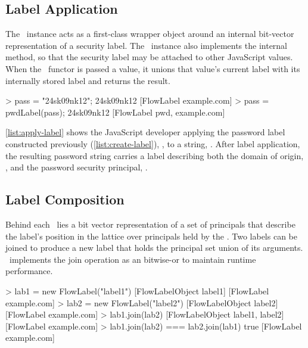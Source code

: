 \subsection{Label Application}

The \FlowLabelObject\ instance acts as a first-class wrapper object around an internal bit-vector representation of a security label.
The \FlowLabelObject\ instance also implements the internal  method, so that the security label may be attached to other JavaScript values.
When the \FlowLabelObject\ functor is passed a value, it unions that value's current label with its internally stored label and returns the result.

\begin{jscode}
> pass = "24sk09nk12";
  24sk09nk12 [FlowLabel example.com]
> pass = pwdLabel(pass);
  24sk09nk12 [FlowLabel pwd, example.com]
\end{jscode}

\autoref{list:apply-label} shows the JavaScript developer applying the password label constructed previously (\autoref{list:create-label}), , to a string, .
After label application, the resulting password string carries a label describing both the domain of origin, , and the password security principal, .

\subsection{Label Composition}

Behind each \FlowLabelObject\ lies a bit vector representation of a set of principals that describe the label's position in the lattice over principals held by the \FlowLabelRegistry.
Two labels can be joined to produce a new label that holds the principal set union of its arguments.
\FlowCore\ implements the join operation as an bitwise-or to maintain runtime performance.

\begin{jscode}
> lab1 = new FlowLabel("label1")
  [FlowLabelObject label1] [FlowLabel example.com]
> lab2 = new FlowLabel("label2")
  [FlowLabelObject label2] [FlowLabel example.com]
> lab1.join(lab2)
  [FlowLabelObject label1, label2] [FlowLabel example.com]
> lab1.join(lab2) === lab2.join(lab1)
  true [FlowLabel example.com]
\end{jscode}

